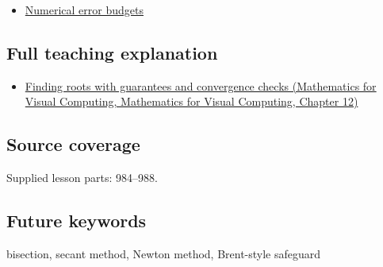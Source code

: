 \begin{itemize}
\tightlist
\item
  \hyperref[appendix-31b8c295e05f]{Numerical error budgets}
\end{itemize}

\subsection{Full teaching explanation}\label{appendix-f63eb850796d-full-teaching-explanation}

\begin{itemize}
\tightlist
\item
  \href{../02-Mathematics-for-Visual-Computing/main.pdf\#nameddest=02-foundations-ii-ch028-finding-roots-with-guarantees-and-convergence-checks}{Finding roots with guarantees and convergence checks (Mathematics for Visual Computing, Mathematics for Visual Computing, Chapter 12)}
\end{itemize}

\subsection{Source coverage}\label{appendix-f63eb850796d-source-coverage}

Supplied lesson parts: 984--988.

\subsection{Future keywords}\label{appendix-f63eb850796d-future-keywords}

bisection, secant method, Newton method, Brent-style safeguard
